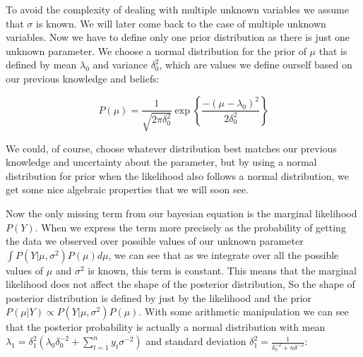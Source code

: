 \documentclass[12pt,a4paper,leqno]{report}
\theoremstyle{plain}
\theoremstyle{definition}
\theoremstyle{remark}
\begin{document}
To avoid the complexity of dealing with multiple unknown variables we assume
that \(\sigma \) is known. We will later come back to the case of multiple
unknown variables. Now we have to define only one prior distribution as there is
just one unknown parameter. We choose a normal distribution for the prior of
\(\mu \) that is defined by mean \(\lambda_0 \) and variance \(\delta_0^2 \),
which are values we define ourself based on our previous knowledge and beliefs:

\begin{def}\label{}
    \begin{equation}\label{}
        P(\mu)
        =
        \frac{1}
        {{\sqrt {2\pi \delta_0^2} }}
        \exp{ \left \{\frac{-(\mu-\lambda_0)^2} {2\delta_0^2} \right \} }
    \end{equation}
\end{def}

We could, of course, choose whatever distribution best matches our previous
knowledge and uncertainty about the parameter, but by using a normal distribution
for prior when the likelihood also follows a normal distribution, we get some
nice algebraic properties that we will soon see.

Now the only missing term from our bayesian equation is the marginal likelihood
\(P(Y) \). When we express the term more precisely as the probability of getting
the data we observed over possible values of our unknown parameter \(\int
P(Y|\mu,\sigma^2)P(\mu) d\mu \), we can see that as we integrate over all the possible
values of \(\mu \) and \(\sigma^2\) is known, this term is constant. This means that the marginal likelihood does
not affect the shape of the posterior distribution, So the shape of posterior
distribution is defined by just by the likelihood and the prior \(P(\mu|Y)
\propto P(Y|\mu, \sigma^2)P(\mu) \). With some arithmetic manipulation we can
see that the posterior probability is actually a normal distribution with mean
\(\lambda_1 = \delta_1^2 \left( \lambda_0 \delta_0^{-2} + \sum_{t=1}^{n} y_t \sigma^{-2}
\right) \) and standard deviation \(\delta_1^2 =
\frac{1}{\delta_0^{-2}+n\delta^{-2}} \):
\end{document}

